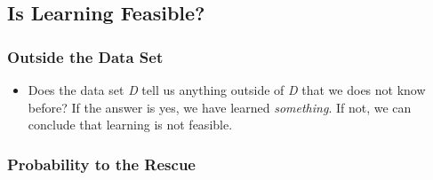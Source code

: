 \documentclass[11pt]{article}
\theoremstyle{definition}
\numberwithin{equation}{section}
\begin{document}
\subsection{Is Learning Feasible?}
\subsubsection{Outside the Data Set}
\begin{itemize}[noitemsep, topsep=0pt]
    \item Does the data set \textit{D} tell us anything outside of \textit{D} that we does not know before? If the answer is yes, we have learned \textit{something}. If not, we can conclude that learning is not feasible.
\end{itemize}

\subsubsection{Probability to the Rescue}
\end{document}

